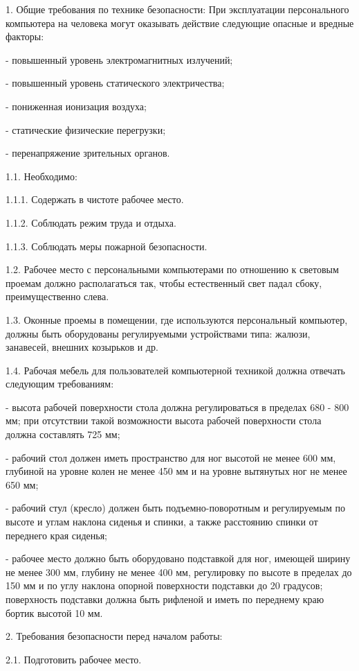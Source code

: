 \documentclass[a4paper,14pt]{extarticle}
\begin{document}
1. Общие требования по технике безопасности:
При эксплуатации персонального компьютера на человека могут оказывать действие следующие опасные и вредные факторы:

- повышенный уровень электромагнитных излучений;

- повышенный уровень статического электричества;

- пониженная ионизация воздуха;

- статические физические перегрузки;

- перенапряжение зрительных органов.

1.1. Необходимо:

1.1.1. Содержать в чистоте рабочее место.

1.1.2. Соблюдать режим труда и отдыха.

1.1.3. Соблюдать меры пожарной безопасности.

1.2. Рабочее место с персональными компьютерами по отношению к световым проемам должно располагаться так, чтобы естественный свет падал сбоку, преимущественно слева.

1.3. Оконные проемы в помещении, где используются персональный компьютер, должны быть оборудованы регулируемыми устройствами типа: жалюзи, занавесей, внешних козырьков и др.

1.4. Рабочая мебель для пользователей компьютерной техникой должна отвечать следующим требованиям:

- высота рабочей поверхности стола должна регулироваться в пределах 680 - 800 мм; при отсутствии такой возможности высота рабочей поверхности стола должна составлять 725 мм;

- рабочий стол должен иметь пространство для ног высотой не менее 600 мм, глубиной на уровне колен не менее 450 мм и на уровне вытянутых ног не менее 650 мм;

- рабочий стул (кресло) должен быть подъемно-поворотным и регулируемым по высоте и углам наклона сиденья и спинки, а также расстоянию спинки от переднего края сиденья;

- рабочее место должно быть оборудовано подставкой для ног, имеющей ширину не менее 300 мм, глубину не менее 400 мм, регулировку по высоте в пределах до 150 мм и по углу наклона опорной поверхности подставки до 20 градусов; поверхность подставки должна быть рифленой и иметь по переднему краю бортик высотой 10 мм.

2. Требования безопасности перед началом работы:

2.1. Подготовить рабочее место.
\end{document}
